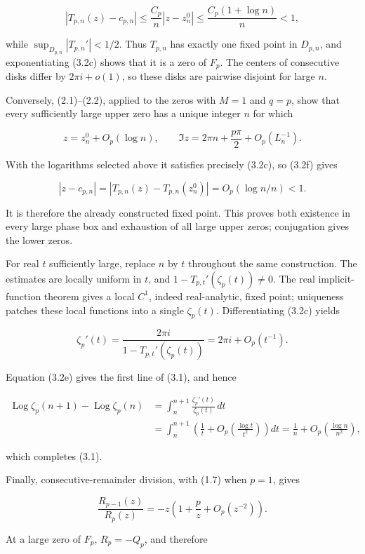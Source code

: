 \documentclass[11pt]{article}
\DeclareMathOperator{\Log}{Log}
\theoremstyle{keio}
\theoremstyle{definition}
\theoremstyle{remark}
\begin{document}
\[
 |T_{p,n}(z)-c_{p,n}|
 \leq \frac{C_p}{n}|z-z_n^0|
 \leq \frac{C_p(1+\log n)}n<1,
\]

while \(\sup_{D_{p,n}}|T_{p,n}'|<1/2\). Thus \(T_{p,n}\) has exactly one
fixed point in \(D_{p,n}\), and exponentiating (3.2c) shows that it is a
zero of \(F_p\). The centers of consecutive disks differ by
\(2\pi i+o(1)\), so these disks are pairwise disjoint for large \(n\).

Conversely, (2.1)--(2.2), applied to the zeros with \(M=1\) and \(q=p\),
show that every
sufficiently large upper zero has a unique integer \(n\) for which

\[
 z=z_n^0+O_p(\log n),\qquad
 \Im z=2\pi n+\frac{p\pi}{2}+O_p(L_n^{-1}).
\]

With the logarithms selected above it satisfies precisely (3.2c), so (3.2f)
gives

\[
 |z-c_{p,n}|=|T_{p,n}(z)-T_{p,n}(z_n^0)|
 =O_p(\log n/n)<1.
\]

It is therefore the already constructed fixed point. This proves both
existence in every large phase box and exhaustion of all large upper zeros;
conjugation gives the lower zeros.

For real \(t\) sufficiently large, replace \(n\) by \(t\) throughout the
same construction. The estimates are locally uniform in \(t\), and
\(1-T_{p,t}'(\zeta_p(t))\ne0\). The real implicit-function theorem gives a
local \(C^1\), indeed real-analytic, fixed point; uniqueness patches these
local functions into a single \(\zeta_p(t)\). Differentiating (3.2c) yields

\[
 \zeta_p'(t)=\frac{2\pi i}{1-T_{p,t}'(\zeta_p(t))}
 =2\pi i+O_p(t^{-1}).
\]

Equation (3.2e) gives the first line of (3.1), and hence

\[
 \begin{aligned}
 \Log\zeta_p(n+1)-\Log\zeta_p(n)
 &=\int_n^{n+1}\frac{\zeta_p'(t)}{\zeta_p(t)}\,dt\\
 &=\int_n^{n+1}\left(\frac1t
    +O_p\left(\frac{\log t}{t^2}\right)\right)dt
 =\frac1n+O_p\left(\frac{\log n}{n^2}\right),
 \end{aligned}
\]

which completes (3.1).

Finally, consecutive-remainder division, with (1.7) when \(p=1\), gives

\[
 \frac{R_{p-1}(z)}{R_p(z)}
 =-z\left(1+\frac pz+O_p(z^{-2})\right).
\tag{Inv-3.2g}
\]

At a large zero of \(F_p\), \(R_p=-Q_p\), and therefore
\end{document}
